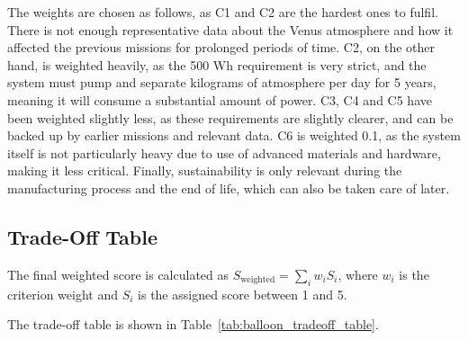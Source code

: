 The weights are chosen as follows, as C1 and C2 are the hardest ones to fulfil. There is not enough representative data about the Venus atmosphere and how it affected the previous missions for prolonged periods of time. C2, on the other hand, is weighted heavily, as the 500 Wh requirement is very strict, and the system must pump and separate kilograms of atmosphere per day for 5 years, meaning it will consume a substantial amount of power. C3, C4 and C5 have been weighted slightly less, as these requirements are slightly clearer, and can be backed up by earlier missions and relevant data. C6 is weighted 0.1, as the system itself is not particularly heavy due to use of advanced materials and hardware, making it less critical. Finally, sustainability is only relevant during the manufacturing process and the end of life, which can also be taken care of later.



\subsection{Trade-Off Table}
\label{subsec:balloon_trade_table}

The final weighted score is calculated as $S_{\mathrm{weighted}} = \sum_i w_i S_i$, where $w_i$ is the criterion weight and $S_i$ is the assigned score between 1 and 5.

The trade-off table is shown in Table~\ref{tab:balloon_tradeoff_table}.

